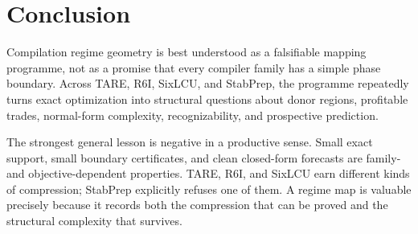 \section{Conclusion}

Compilation regime geometry is best understood as a falsifiable mapping programme, not as a promise that every compiler family has a simple phase boundary. Across TARE, R6I, SixLCU, and StabPrep, the programme repeatedly turns exact optimization into structural questions about donor regions, profitable trades, normal-form complexity, recognizability, and prospective prediction.

The strongest general lesson is negative in a productive sense. Small exact support, small boundary certificates, and clean closed-form forecasts are family- and objective-dependent properties. TARE, R6I, and SixLCU earn different kinds of compression; StabPrep explicitly refuses one of them. A regime map is valuable precisely because it records both the compression that can be proved and the structural complexity that survives.